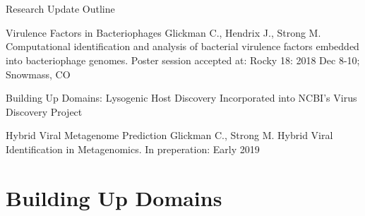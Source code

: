 \documentclass[11pt, xcolor=table]{beamer}
\begin{document}
	
\section{}
	\begin{frame}{Research Update Outline}
	\begin{block}{\textcolor{black!50}{Virulence Factors in Bacteriophages}}
	\textcolor{black!50}{\tiny{Glickman C., Hendrix J., Strong M. Computational identification and analysis of bacterial virulence factors embedded into bacteriophage genomes. Poster session accepted at: Rocky 18: 2018 Dec 8-10; Snowmass, CO}}
	\end{block}
	
	\begin{block}{Building Up Domains: Lysogenic Host Discovery}
  Incorporated into NCBI's Virus Discovery Project
	\end{block}

	\begin{block}{\textcolor{black!50}{Hybrid Viral Metagenome Prediction}}
	\textcolor{black!50}{\tiny{Glickman C., Strong M. Hybrid Viral Identification in Metagenomics. In preperation: Early 2019}}
	\end{block}
	\end{frame}
	
\section{Building Up Domains}
\subsection{}
	
\end{document}
